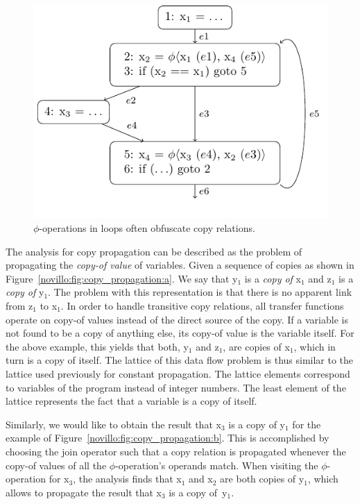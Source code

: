 \begin{figure}[b!]
  \begin{center}
    \includegraphics{copy_propagation_loop}
  \end{center}
  \vspace{-1em}
  \caption{$\phi$-operations in loops often obfuscate copy relations.}
  \label{novillo:fig:copy_propagation_loop}
\end{figure}

The analysis for copy propagation can be described as the problem of
propagating the \textit{copy-of value} of variables.  Given a sequence of
copies as shown in Figure~\ref{novillo:fig:copy_propagation:a}. We say that
y$_1$ is a \textit{copy of} x$_1$ and z$_1$ is a \textit{copy of} y$_1$.  The
problem with this representation is that there is no apparent link from z$_1$ to
x$_1$.  In order to handle transitive copy relations, all transfer functions
operate on copy-of values instead of the direct source of the copy.  If a
variable is not found to be a copy of anything else, its copy-of value is the
variable itself. For the above example, this yields that both, y$_1$ and z$_1$,
are copies of x$_1$, which in turn is a copy of itself. The lattice of this data
flow problem is thus similar to the lattice used previously for constant
propagation. The lattice elements correspond to variables of the
program instead of integer numbers. The least element of the lattice
represents the fact that a variable is a copy of itself.

Similarly, we would like to obtain the result that x$_3$ is a copy of y$_1$ for
the example of Figure~\ref{novillo:fig:copy_propagation:b}. This is
accomplished by choosing the join operator such that a copy relation is
propagated whenever the copy-of values of all the $\phi$-operation's operands
match. When visiting the $\phi$-operation for x$_3$, the analysis finds
that x$_1$ and x$_2$ are both copies of y$_1$, which allows to propagate the
result that x$_3$ is a copy of~y$_1$.

